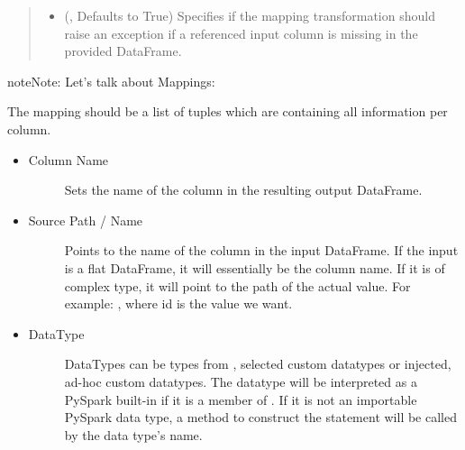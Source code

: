 \documentclass[a4paper,10pt, twoside,english]{sphinxmanual}
\begin{document}
\begin{fulllineitems}
\begin{quote}
\begin{description}
\begin{itemize}
\item {} 
 (, Defaults to True) \textendash{} Specifies if the mapping transformation should raise an exception if a referenced input
column is missing in the provided DataFrame.

\end{itemize}

\end{description}\end{quote}

\begin{sphinxadmonition}{note}{Note:}
Let’s talk about Mappings:

The mapping should be a list of tuples which are containing all information per column.
\begin{itemize}
\item {} \begin{description}
\item[{Column Name}] \leavevmode{[}\sphinxhref{https://docs.python.org/3.7/library/stdtypes.html\#str}{\sphinxcode{\sphinxupquote{str}}}{]}
Sets the name of the column in the resulting output DataFrame.

\end{description}

\item {} \begin{description}
\item[{Source Path / Name}] \leavevmode{[}\sphinxhref{https://docs.python.org/3.7/library/stdtypes.html\#str}{\sphinxcode{\sphinxupquote{str}}}{]}
Points to the name of the column in the input DataFrame. If the input
is a flat DataFrame, it will essentially be the column name. If it is of complex
type, it will point to the path of the actual value. For example:
, where id is the value we want.

\end{description}

\item {} \begin{description}
\item[{DataType}] \leavevmode{[}\sphinxhref{https://docs.python.org/3.7/library/stdtypes.html\#str}{\sphinxcode{\sphinxupquote{str}}}{]}
DataTypes can be types from , selected custom datatypes or
injected, ad-hoc custom datatypes.
The datatype will be interpreted as a PySpark built-in if it is a member of .
If it is not an importable PySpark data type, a method to construct the statement will be
called by the data type’s name.


\end{description}
\end{itemize}
\end{sphinxadmonition}
\end{fulllineitems}
\end{document}
